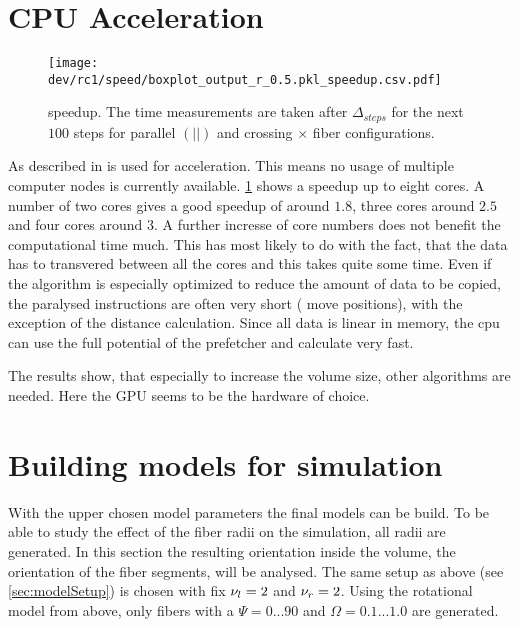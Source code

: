 \section{CPU Acceleration}
% 
\begin{figure}[!t]
\centering
\texttt{[image: dev/rc1/speed/boxplot\_output\_r\_0.5.pkl\_speedup.csv.pdf]}
\caption[ speedup]{ speedup. The time measurements are taken after $\Delta_{\mathit{steps}}$ for the next $100$ steps for parallel $(||)$ and crossing $\times$ fiber configurations.}
\label{fig:solverSpeedup}
\end{figure}
% 
As described in \dummy{} \openmp{} is used for acceleration.
This means no usage of multiple computer nodes is currently available.
\cref{fig:solverSpeedup} shows a speedup up to eight cores.
A number of two cores gives a good speedup of around $1.8$, three cores around $2.5$ and four cores around $3$.
A further incresse of core numbers does not benefit the computational time much.
This has most likely to do with the fact, that the data has to transvered between all the cores and this takes quite some time.
Even if the algorithm is especially optimized to reduce the amount of data to be copied, the paralysed instructions are often very short (\eg{} move positions), with the exception of the distance calculation.
Since all data is linear in memory, the cpu can use the full potential of the prefetcher and calculate very fast.
\par
% 
The results show, that especially to increase the volume size, other algorithms are needed. 
Here the \ac{GPU} seems to be the hardware of choice.
% 
% 
% 
\section{Building models for simulation}
% 
With the upper chosen model parameters the final models can be build.
To be able to study the effect of the fiber radii on the simulation, all radii are generated.
In this section the resulting orientation inside the volume, \ie{} the orientation of the fiber segments, will be analysed.
The same setup as above (see \cref{sec:modelSetup}) is chosen with fix $\textnormal{$\nu_{l}$}=\SI{2}{}$ and $\textnormal{$\nu_{r}$} = \SI{2}{}$.
Using the rotational model from above, only fibers with a $\Psi =  0...90$ and $\Omega = 0.1...1.0$ are generated.
% 
% 
% 
